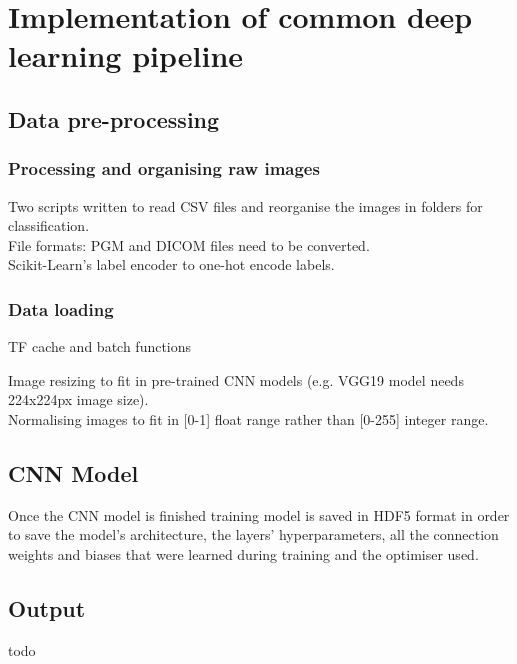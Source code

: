 \section{Implementation of common deep learning pipeline}


\subsection{Data pre-processing}

\subsubsection{Processing and organising raw images}

Two scripts written to read CSV files and reorganise the images in folders for classification.\\

File formats: PGM and DICOM files need to be converted.\\

Scikit-Learn's label encoder to one-hot encode labels.

\subsubsection{Data loading}

TF cache and batch functions

Image resizing to fit in pre-trained CNN models (e.g. VGG19 model needs 224x224px image size).\\

Normalising images to fit in [0-1] float range rather than [0-255] integer range.


\subsection{CNN Model}

Once the CNN model is finished training model is saved in HDF5 format in order to save the model's architecture, the layers' hyperparameters, all the connection weights and biases that were learned during training \cite{Geron2019} and the optimiser used.


\subsection{Output}

todo

